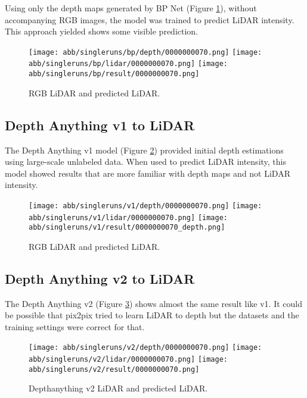 Using only the depth maps generated by BP Net (Figure \ref{bp_results}), without accompanying RGB images, the model was trained to predict LiDAR intensity. This approach yielded shows some visible prediction.
\begin{figure}[!ht]
	\centering
	\texttt{[image: abb/singleruns/bp/depth/0000000070.png]}
	\texttt{[image: abb/singleruns/bp/lidar/0000000070.png]}
	\texttt{[image: abb/singleruns/bp/result/0000000070.png]}
	\caption{RGB LiDAR and predicted LiDAR.}
	\label{bp_results}
\end{figure}
\newpage
\subsection{Depth Anything v1 to LiDAR}

The Depth Anything v1 model (Figure \ref{v1_results}) provided initial depth estimations using large-scale unlabeled data. When used to predict LiDAR intensity, this model showed results that are more familiar with depth maps and not LiDAR intensity.
\begin{figure}[!ht]
	\centering
	\texttt{[image: abb/singleruns/v1/depth/0000000070.png]}
	\texttt{[image: abb/singleruns/v1/lidar/0000000070.png]}
	\texttt{[image: abb/singleruns/v1/result/0000000070\_depth.png]}
	\caption{RGB LiDAR and predicted LiDAR.}
	\label{v1_results}
\end{figure}
\newpage
\subsection{Depth Anything v2 to LiDAR}

The Depth Anything v2 (Figure \ref{v2_results}) shows almost the same result like v1. It could be possible that pix2pix tried to learn LiDAR to depth but the datasets and the training settings were correct for that.
\begin{figure}[!ht]
	\centering
	\texttt{[image: abb/singleruns/v2/depth/0000000070.png]}
	\texttt{[image: abb/singleruns/v2/lidar/0000000070.png]}
	\texttt{[image: abb/singleruns/v2/result/0000000070.png]}
	\caption{Depthanything v2 LiDAR and predicted LiDAR.}
	\label{v2_results}
\end{figure}
\newpage
